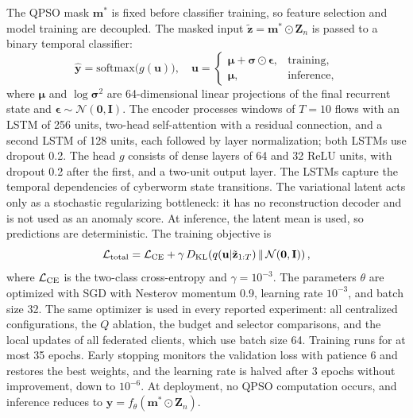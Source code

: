 \documentclass[conference]{IEEEtran}
\begin{document}
The QPSO mask $\mathbf{m}^{*}$ is fixed before classifier training,
so feature selection and model training are decoupled. The masked
input $\tilde{\mathbf{z}}=\mathbf{m}^{*}\odot\mathbf{Z}_n$ is passed
to a binary temporal classifier:
\begin{equation}
\hat{\mathbf{y}} = \mathrm{softmax}\bigl(g(\mathbf{u})\bigr),\quad
\mathbf{u} = \begin{cases}
\boldsymbol{\mu}+\boldsymbol{\sigma}\odot\boldsymbol{\epsilon}, & \text{training},\\
\boldsymbol{\mu}, & \text{inference},
\end{cases}
\label{eq:classifier}
\end{equation}
where $\boldsymbol{\mu}$ and
$\log\boldsymbol{\sigma}^2$ are 64-dimensional linear projections of
the final recurrent state and
$\boldsymbol{\epsilon}\sim\mathcal{N}(\mathbf{0},\mathbf{I})$. The
encoder processes windows of $T=10$ flows with an LSTM of 256 units,
two-head self-attention with a residual connection, and a second LSTM
of 128 units, each followed by layer normalization; both LSTMs use
dropout 0.2. The head $g$ consists of dense layers of 64 and 32 ReLU
units, with dropout 0.2 after the first, and a two-unit output layer.
The LSTMs capture the temporal dependencies of cyberworm state
transitions. The variational latent acts only as a stochastic
regularizing bottleneck: it has no reconstruction decoder and is not
used as an anomaly score. At inference, the latent mean is used, so
predictions are deterministic. The training objective is
\begin{equation}
\mathcal{L}_{\rm total} = \mathcal{L}_{\rm CE}
+ \gamma\,D_{\rm KL}\!\left(q(\mathbf{u}|\tilde{\mathbf{z}}_{1:T})\,\|\,
\mathcal{N}(\mathbf{0},\mathbf{I})\right),
\label{eq:total_loss}
\end{equation}
where $\mathcal{L}_{\rm CE}$ is the
two-class cross-entropy and $\gamma=10^{-3}$.
The parameters $\theta$ are optimized with
SGD with Nesterov momentum 0.9, learning rate $10^{-3}$, and batch
size 32. The same optimizer is used in every reported experiment:
all centralized configurations, the $Q$ ablation, the budget and
selector comparisons, and the local updates of all federated clients,
which use batch size 64. Training runs
for at most 35 epochs. Early stopping monitors the validation loss
with patience 6 and restores the best weights, and the learning rate
is halved after 3 epochs without improvement, down to $10^{-6}$.
At deployment, no QPSO computation occurs, and inference reduces to
$\hat{\mathbf{y}}=f_\theta(\mathbf{m}^{*}\odot\mathbf{Z}_n)$.
\end{document}

